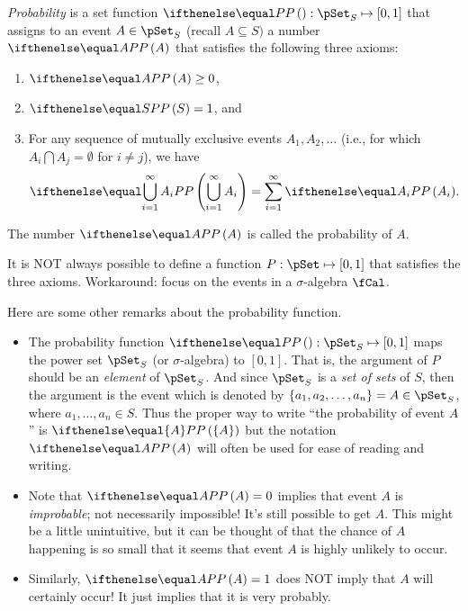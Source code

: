 \begin{mydefinition}[Probability]
    \emph{Probability} is a set function $\prob{}:\pSet_{S}\mapsto [0,1]$ that assigns to an event $A\in\pSet_{S}$ (recall $A\subseteq S)$ a number $\prob{A}$ that satisfies the following three axioms:
    \begin{enumerate}
        \item $\prob{A}\geq0$,
        \item $\prob{S}=1$, and
        \item For any sequence of mutually exclusive events $A_{1}, A_{2}, \ldots$ (i.e., for which $A_{i}\bigcap A_{j}=\emptyset$ for $i\neq j$), we have
        \begin{align}
            \prob{\bigcup_{i=1}^{\infty} A_{i}}=\sum_{i=1}^{\infty} \prob{A_{i}}.
        \end{align}
    \end{enumerate}
    The number $\prob{A}$ is called the probability of $A$.
\end{mydefinition}
\begin{remark}
        It is NOT always possible to define a function $P:\pSet\mapsto[0,1]$ that satisfies the three axioms.
        Workaround: focus on the events in a $\sigma$-algebra $\fCal$.
        
        Here are some other remarks about the probability function.
        \begin{myBlueBox}
            \begin{itemize}
                \item The probability function $\prob{}:\pSet_{S}\mapsto[0,1]$ maps  the power set $\pSet_{S}$ (or $\sigma$-algebra) to $[0,1]$. That is, the argument of $P$ should be an \emph{element} of $\pSet_{S}$. And since $\pSet_{S}$ is a \emph{set of sets} of $S$, then the argument is the event which is denoted by $\{a_{1},a_{2},\ldots,a_{n}\}=A\in\pSet_{S}$, where $a_{1}, \ldots, a_{n} \in S$.  Thus the proper way to write ``the probability of event $A$'' is $\prob{\{A\}}$ but the notation $\prob{A}$ will often be used for ease of reading and writing.

                \item Note that $\prob{A} = 0$ implies that event $A$ is \emph{improbable}; not necessarily impossible! It's still possible to get $A$. This might be a little unintuitive, but it can be thought of that the chance of $A$ happening is so small that it seems that event $A$ is highly unlikely to occur.
                \item Similarly, $\prob{A}= 1$ does NOT imply that $A$ will certainly occur! It just implies that it is very probably.
            \end{itemize}
        \end{myBlueBox}
\end{remark}

